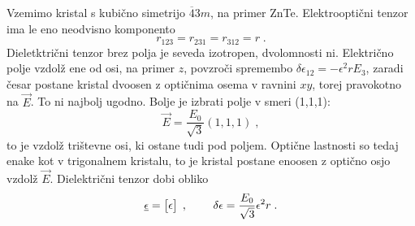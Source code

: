 \documentclass[11pt,fleqn]{book} %
\begin{document}
Vzemimo kristal s kubično simetrijo $\overline{4}3m$, na primer ZnTe.
Elektrooptični tenzor ima le eno neodvisno komponento 
\begin{equation}
r_{123}=r_{231}=r_{312}=r\;.\label{7.6}
\end{equation}
 Dieletktrični tenzor brez polja je seveda izotropen, dvolomnosti
ni. Električno polje vzdolž ene od osi, na primer $z$, povzroči spremembo
$\delta\epsilon_{12}=-\epsilon^{2}rE_{3}$, zaradi česar postane kristal
dvoosen z optičnima osema v ravnini $xy$, torej pravokotno na $\vec{E}$.
To ni najbolj ugodno. Bolje je izbrati polje v smeri (1,1,1): 
\begin{equation}
\vec{E}=\frac{E_{0}}{\sqrt{3}}(1,1,1)\;,\label{7.7}
\end{equation}
 to je vzdolž trištevne osi, ki ostane tudi pod poljem. Optične lastnosti
so tedaj enake kot v trigonalnem kristalu, to je kristal postane enoosen
z optično osjo vzdolž $\vec{E}$. Dielektrični tenzor dobi obliko
\begin{equation}
\underline{\epsilon}=\left[\begin{matrix}\epsilon\end{matrix}\right]\;,\hskip0.8cm\delta\epsilon=\frac{E_{0}}{\sqrt{3}}\epsilon^{2}r\;.\label{7.8}
\end{equation}
\end{document}
